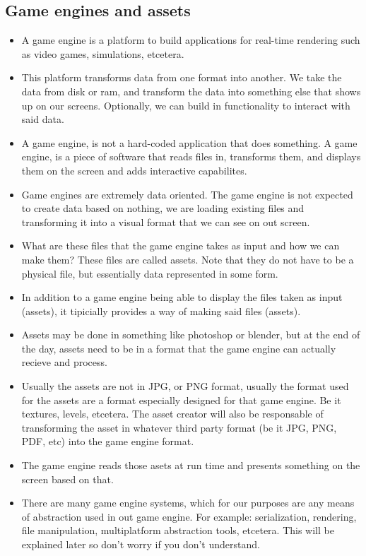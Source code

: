 \subsection{Game engines and assets}
\begin{itemize}
    \item A game engine is a platform to build applications for real-time rendering such as video games, simulations, etcetera.
    \item This platform transforms data from one format into another. We take the data from disk or ram, and transform the data into something else that shows up on our screens. Optionally, we can build in functionality to interact with said data.
    \item A game engine, is not a hard-coded application that does something. A game engine, is a piece of software that reads files in, transforms them, and displays them on the screen and adds interactive capabilites.
    \item Game engines are extremely data oriented. The game engine is not expected to create data based on nothing, we are loading existing files and transforming it into a visual format that we can see on out screen.
    \item What are these files that the game engine takes as input and how we can make them? These files are called assets. Note that they do not have to be a physical file, but essentially data represented in some form. 
    \item In addition to a game engine being able to display the files taken as input (assets), it tipicially provides a way of making said files (assets). 
    \item Assets may be done in something like photoshop or blender, but at the end of the day, assets need to be in a format that the game engine can actually recieve and process.
    \item Usually the assets are not in JPG, or PNG format, usually the format used for the assets are a format especially designed for that game engine. Be it textures, levels, etcetera. The asset creator will also be responsable of transforming the asset in whatever third party format (be it JPG, PNG, PDF, etc) into the game engine format.
    \item The game engine reads those asets at run time and presents something on the screen based on that.
    \item There are many game engine systems, which for our purposes are any means of abstraction used in out game engine. For example: serialization, rendering, file manipulation, multiplatform abstraction tools, etcetera. This will be explained later so don't worry if you don't understand.

\end{itemize}
